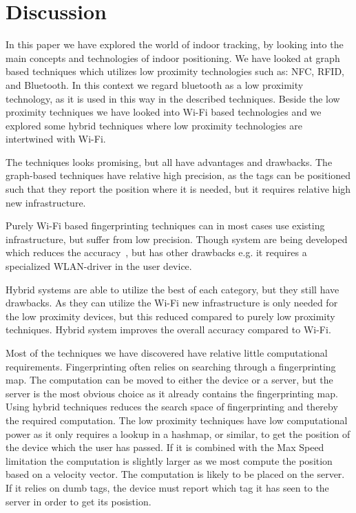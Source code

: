 \section{Discussion}
In this paper we have explored the world of indoor tracking, by looking into the main concepts and technologies of indoor positioning. 
We have looked at graph based techniques which utilizes low proximity technologies such as: NFC, RFID, and Bluetooth. 
In this context we regard bluetooth as a low proximity technology, as it is used in this way in the described techniques. 
Beside the low proximity techniques we have looked into Wi-Fi based technologies and we explored some hybrid techniques where low proximity technologies are intertwined with Wi-Fi. 

The techniques looks promising, but all have advantages and drawbacks. 
The graph-based techniques have relative high precision, as the tags can be positioned such that they report the position where it is needed, but it requires relative high new infrastructure. 

Purely Wi-Fi based fingerprinting techniques can in most cases use existing infrastructure, but suffer from low precision.
Though system are being developed which reduces the accuracy~\cite{Youssef2005}, but has other drawbacks e.g. it requires a specialized WLAN-driver in the user device. 

Hybrid systems are able to utilize the best of each category, but they still have drawbacks. 
As they can utilize the Wi-Fi new infrastructure is only needed for the low proximity devices, but this reduced compared to purely low proximity techniques. 
Hybrid system improves the overall accuracy compared to Wi-Fi. 

Most of the techniques we have discovered have relative little computational requirements. 
Fingerprinting often relies on searching through a fingerprinting map. 
The computation can be moved to either the device or a server, but the server is the most obvious choice as it already contains the fingerprinting map. 
Using hybrid techniques reduces the search space of fingerprinting and thereby the required computation.
The low proximity techniques have low computational power as it only requires a lookup in a hashmap,  or similar, to get the position of the device which the user has passed. 
If it is combined with the Max Speed limitation the computation is slightly larger as we most compute the position based on a velocity vector. 
The computation is likely to be placed on the server. 
If it relies on dumb tags, the device must report which tag it has seen to the server in order to get its posistion.
